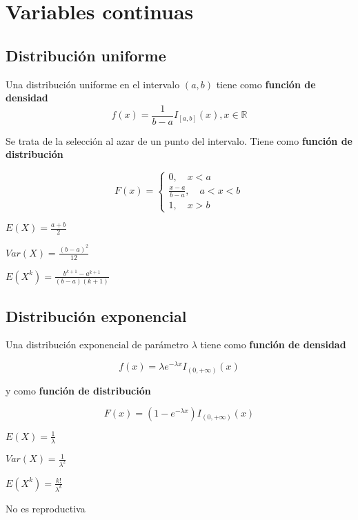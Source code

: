 \chapter{Variables continuas}
\section{Distribución uniforme}

Una distribución uniforme en el intervalo $(a,b)$ tiene
como \textbf{función de densidad}
$$f(x)=\frac{1}{b-a}I_{[a,b]}(x),x\in \mathbb{R} $$

Se trata de la selección al azar de un punto del intervalo.
Tiene como \textbf{función de distribución}

$$
F(x)=
\left\{
  \begin{array}{l}
    0, \quad x<a \\
    \frac{x-a}{b-a}, \quad a<x<b \\
    1, \quad x>b
  \end{array}
    \right.
    $$

\begin{itemize*}
\item $E(X)=\frac{a+b}{2}$
  \vspace{2mm}
\item $Var(X)= \frac{(b-a)^2}{12}$
  \vspace{2mm}
\item $E(X^k)=\frac{b^{k+1}-a^{k+1}}{(b-a)(k+1)}$
\end{itemize*}

\section{Distribución exponencial}

Una distribución exponencial de parámetro $\lambda $ tiene
como \textbf{función de densidad}

$$f(x)=\lambda e^{-\lambda x}I_{(0,+\infty)}(x)$$

y como \textbf{función de distribución}

$$F(x)=(1-e^{-\lambda x})I_{(0,+\infty)}(x)$$

\begin{itemize*}
\item $E(X)= \frac{1}{\lambda }$
\item $Var(X)= \frac{1}{\lambda^2 }$
\item $E(X^k)=\frac{k!}{\lambda^k}$
\item No es reproductiva
\end{itemize*}

